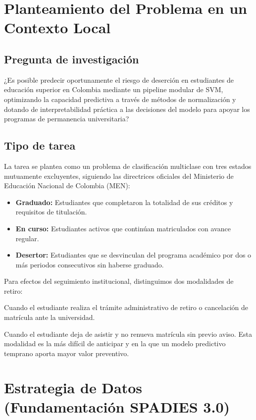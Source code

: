 \documentclass[12pt,a4paper]{article}
\begin{document}
\section{Planteamiento del Problema en un Contexto Local}

\subsection{Pregunta de investigación}
¿Es posible predecir oportunamente el riesgo de deserción en estudiantes de educación superior en Colombia mediante un pipeline modular de SVM, optimizando la capacidad predictiva a través de métodos de normalización y dotando de interpretabilidad práctica a las decisiones del modelo para apoyar los programas de permanencia universitaria?

\subsection{Tipo de tarea}
La tarea se plantea como un problema de clasificación multiclase con tres estados mutuamente excluyentes, siguiendo las directrices oficiales del Ministerio de Educación Nacional de Colombia (MEN):
\begin{itemize}
    \item \textbf{Graduado:} Estudiantes que completaron la totalidad de sus créditos y requisitos de titulación.
    \item \textbf{En curso:} Estudiantes activos que continúan matriculados con avance regular.
    \item \textbf{Desertor:} Estudiantes que se desvinculan del programa académico por dos o más periodos consecutivos sin haberse graduado.
\end{itemize}

Para efectos del seguimiento institucional, distinguimos dos modalidades de retiro:
\begin{description}[style=multiline, leftmargin=3.5cm]
    \item[Abandono formal:] Cuando el estudiante realiza el trámite administrativo de retiro o cancelación de matrícula ante la universidad.
    \item[Abandono informal o silencioso:] Cuando el estudiante deja de asistir y no renueva matrícula sin previo aviso. Esta modalidad es la más difícil de anticipar y en la que un modelo predictivo temprano aporta mayor valor preventivo.
\end{description}

\section{Estrategia de Datos (Fundamentación SPADIES 3.0)}
\end{document}
